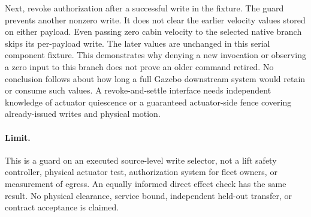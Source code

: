 \documentclass[11pt]{article}
\begin{document}
Next, revoke authorization after a successful write in the fixture.
The guard prevents another nonzero write. It does not clear the
earlier velocity values stored on either payload. Even passing
zero cabin velocity to the selected native branch skips its
per-payload write. The later values are unchanged in this serial
component fixture. This demonstrates why denying a new invocation
or observing a zero input to this branch does not prove an older
command retired. No conclusion follows about how long a full
Gazebo downstream system would retain or consume such values.
A revoke-and-settle interface needs independent knowledge of
actuator quiescence or a guaranteed actuator-side fence
covering already-issued writes and physical motion.

\paragraph{Limit.}
This is a guard on an executed source-level write selector, not
a lift safety controller, physical actuator test, authorization
system for fleet owners, or measurement of egress. An equally
informed direct effect check has the same result. No physical
clearance, service bound, independent held-out transfer, or
contract acceptance is claimed.
\end{document}
